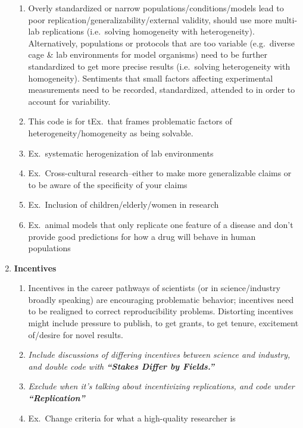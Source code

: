 \documentclass[
]{scrartcl}
\begin{document}
\begin{enumerate}
\begin{enumerate}
  \item
    Overly standardized or narrow populations/conditions/models lead to
    poor replication/generalizability/external validity, should use more
    multi-lab replications (i.e.~solving homogeneity with
    heterogeneity). Alternatively, populations or protocols that are too
    variable (e.g.~diverse cage \& lab environments for model organisms)
    need to be further standardized to get more precise results
    (i.e.~solving heterogeneity with homogeneity). Sentiments that small
    factors affecting experimental measurements need to be recorded,
    standardized, attended to in order to account for variability.
  \item
    This code is for tEx.~that frames problematic factors of
    heterogeneity/homogeneity as being solvable.
  \item
    Ex.~systematic herogenization of lab environments
  \item
    Ex.~Cross-cultural research--either to make more generalizable
    claims or to be aware of the specificity of your claims
  \item
    Ex.~Inclusion of children/elderly/women in research
  \item
    Ex.~animal models that only replicate one feature of a disease and
    don't provide good predictions for how a drug will behave in human
    populations
  \end{enumerate}
\item
  \textbf{Incentives}

  \begin{enumerate}

  \item
    Incentives in the career pathways of scientists (or in
    science/industry broadly speaking) are encouraging problematic
    behavior; incentives need to be realigned to correct reproducibility
    problems. Distorting incentives might include pressure to publish,
    to get grants, to get tenure, excitement of/desire for novel
    results.
  \item
    \emph{Include discussions of differing incentives between science
    and industry, and double code with \textbf{``Stakes Differ by
    Fields.''} }
  \item
    \emph{Exclude when it's talking about incentivizing replications,
    and code under \textbf{``Replication''} }
  \item
    Ex.~Change criteria for what a high-quality researcher is

    \begin{enumerate}
    

\end{enumerate}
\end{enumerate}
\end{enumerate}
\end{document}
